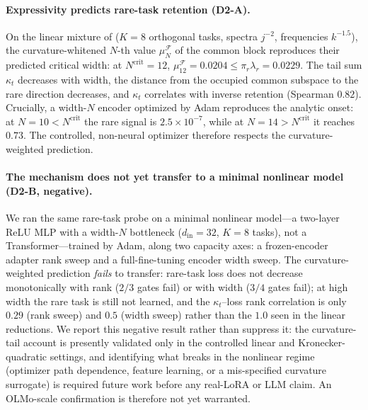 \paragraph{Expressivity predicts rare-task retention (D2-A).}
On the linear mixture of \citet{huang2026larger} ($K=8$ orthogonal tasks,
spectra $j^{-2}$, frequencies $k^{-1.5}$), the curvature-whitened $N$-th value
$\mu_N^{\mathcal{F}}$ of the common block reproduces their predicted critical
width: at $N^{\mathrm{crit}}=12$, $\mu_{12}^{\mathcal{F}}=0.0204\le\pi_r\lambda_r=0.0229$.
The tail sum $\kappa_t$ decreases with width, the distance from the occupied
common subspace to the rare direction decreases, and $\kappa_t$ correlates with
inverse retention (Spearman $0.82$). Crucially, a width-$N$ encoder optimized by
Adam reproduces the analytic onset: at $N=10<N^{\mathrm{crit}}$ the rare signal
is $2.5\times10^{-7}$, while at $N=14>N^{\mathrm{crit}}$ it reaches $0.73$. The
controlled, non-neural optimizer therefore respects the curvature-weighted
prediction.

\paragraph{The mechanism does not yet transfer to a minimal nonlinear model (D2-B, negative).}
We ran the same rare-task probe on a minimal nonlinear model---a two-layer ReLU
MLP with a width-$N$ bottleneck ($d_{\mathrm{in}}{=}32$, $K{=}8$ tasks), not a
Transformer---trained by Adam, along two capacity axes: a frozen-encoder adapter
rank sweep and a full-fine-tuning encoder width sweep. The curvature-weighted
prediction \emph{fails} to transfer: rare-task loss does not decrease
monotonically with rank ($2/3$ gates fail) or with width ($3/4$ gates fail); at
high width the rare task is still not learned, and the $\kappa_t$--loss rank
correlation is only $0.29$ (rank sweep) and $0.5$ (width sweep) rather than the
$1.0$ seen in the linear reductions. We report this negative result rather than
suppress it: the curvature-tail account is presently validated only in the
controlled linear and Kronecker-quadratic settings, and identifying what breaks
in the nonlinear regime (optimizer path dependence, feature learning, or a
mis-specified curvature surrogate) is required future work before any real-LoRA
or LLM claim. An OLMo-scale confirmation is therefore not yet warranted.

